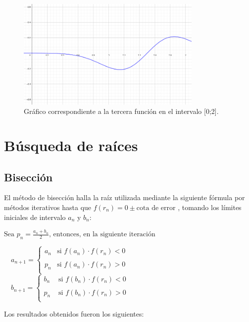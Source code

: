 \documentclass[titlepage,a4paper]{article}
\begin{document}
\begin{figure}[H]
\centering
\includegraphics[width=0.8\textwidth]{funcion3.png}
\caption{\label{fig:class01}Gráfico correspondiente a la tercera función en el intervalo [0;2].}
\end{figure}

\section{Búsqueda de raíces}\label{sec:busqueda_raices}

\subsection{Bisección}\label{sec:biseccion}
El método de bisección halla la raíz utilizada mediante la siguiente fórmula por métodos iterativos hasta que 
$ f(r_n)=0\pm \mbox{cota de error} $ , tomando los límites iniciales de intervalo ${a_n}$ y ${b_n}$:

\smallskip

$\mbox{Sea }p_n = \frac{a_n+b_n}{2}\mbox{, entonces, en la siguiente iteración}$
\begin{center}
    $
    \quad a_{n+1} =\left\{ \begin{array}{lcc}
                 a_n & \mbox{si } f(a_n)\cdot f(r_n) <0 \\
                 \\ p_n & \mbox{si } f(a_n)\cdot f(r_n) > 0 \\
                 \end{array}
       \right. 
    $
    $
    \quad b_{n+1} =\left\{ \begin{array}{lcc}
                 b_n & \mbox{ si } f(b_n)\cdot f(r_n) < 0 \\
                 \\p_n & \mbox{ si } f(b_n)\cdot f(r_n) > 0 \\
                 \end{array}
       \right.
    $
\end{center}
\smallskip
Los resultados obtenidos fueron los siguientes:
\end{document}
